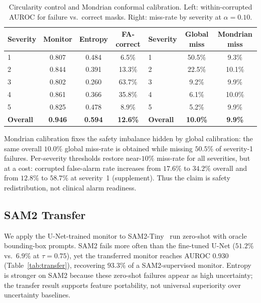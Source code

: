 \documentclass[runningheads]{llncs}
\newcommand{\unet}{U-Net}
\begin{document}
\begin{table}[t]
\caption{Circularity control and Mondrian conformal calibration. Left:
within-corrupted AUROC for failure vs.\ correct masks. Right: miss-rate by
severity at $\alpha=0.10$.}
\label{tab:circularity}
\centering
\footnotesize
\begin{tabular}{lccc@{\qquad}lcc}
\toprule
Severity & Monitor & Entropy & FA-correct & Severity & Global miss & Mondrian miss \\
\midrule
1 & 0.807 & 0.484 & 6.5\% & 1 & 50.5\% & 9.3\% \\
2 & 0.844 & 0.391 & 13.3\% & 2 & 22.5\% & 10.1\% \\
3 & 0.802 & 0.260 & 63.7\% & 3 & 9.2\% & 9.9\% \\
4 & 0.861 & 0.366 & 35.8\% & 4 & 6.1\% & 10.0\% \\
5 & 0.825 & 0.478 & 8.9\% & 5 & 5.2\% & 9.9\% \\
\midrule
\textbf{Overall} & \textbf{0.946} & \textbf{0.594} & \textbf{12.6\%} &
\textbf{Overall} & \textbf{10.0\%} & \textbf{9.9\%} \\
\bottomrule
\end{tabular}
\end{table}

Mondrian calibration fixes the safety imbalance hidden by global calibration:
the same overall $10.0\%$ global miss-rate is obtained while missing $50.5\%$
of severity-1 failures. Per-severity thresholds restore near-$10\%$ miss-rate
for all severities, but at a cost: corrupted false-alarm rate increases from
$17.6\%$ to $34.2\%$ overall and from $12.8\%$ to $58.7\%$ at severity~1
(supplement). Thus the claim is safety redistribution, not clinical alarm
readiness.

\subsection{SAM2 Transfer}

We apply the \unet{}-trained monitor to SAM2-Tiny~\cite{ref:ravi} run
zero-shot with oracle bounding-box prompts. SAM2 fails more often than the
fine-tuned \unet{} ($51.2\%$ vs.\ $6.9\%$ at $\tau=0.75$), yet the transferred
monitor reaches AUROC $0.930$ (Table~\ref{tab:transfer}), recovering $93.3\%$
of a SAM2-supervised monitor. Entropy is stronger on SAM2 because these
zero-shot failures appear as high uncertainty; the transfer result supports
feature portability, not universal superiority over uncertainty baselines.
\end{document}
